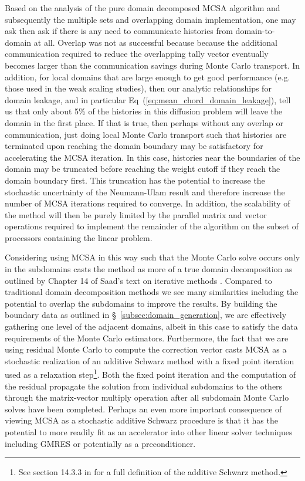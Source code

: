 Based on the analysis of the pure domain decomposed MCSA algorithm and
subsequently the multiple sets and overlapping domain implementation,
one may ask then ask if there is any need to communicate histories
from domain-to-domain at all. Overlap was not as successful because
because the additional communication required to reduce the
overlapping tally vector eventually becomes larger than the
communication savings during Monte Carlo transport. In addition, for
local domains that are large enough to get good performance
(e.g. those used in the weak scaling studies), then our analytic
relationships for domain leakage, and in particular
Eq~(\ref{eq:mean_chord_domain_leakage}), tell us that only about 5\%
of the histories in this diffusion problem will leave the domain in
the first place.  If that is true, then perhaps without any overlap or
communication, just doing local Monte Carlo transport such that
histories are terminated upon reaching the domain boundary may be
satisfactory for accelerating the MCSA iteration. In this case,
histories near the boundaries of the domain may be truncated before
reaching the weight cutoff if they reach the domain boundary
first. This truncation has the potential to increase the stochastic
uncertainty of the Neumann-Ulam result and therefore increase the
number of MCSA iterations required to converge. In addition, the
scalability of the method will then be purely limited by the parallel
matrix and vector operations required to implement the remainder of
the algorithm on the subset of processors containing the linear
problem.

Considering using MCSA in this way such that the Monte Carlo solve
occurs only in the subdomains casts the method as more of a true
domain decomposition as outlined by Chapter 14 of Saad's text on
iterative methods \citep{saad_iterative_2003}. Compared to traditional
domain decomposition methods we see many similarities including the
potential to overlap the subdomains to improve the results. By
building the boundary data as outlined in
\S~\ref{subsec:domain_generation}, we are effectively gathering one
level of the adjacent domains, albeit in this case to satisfy the data
requirements of the Monte Carlo estimators. Furthermore, the fact that
we are using residual Monte Carlo to compute the correction vector
casts MCSA as a stochastic realization of an additive Schwarz method
with a fixed point iteration used as a relaxation step\footnote{See
  section 14.3.3 in \citep{saad_iterative_2003} for a full definition
  of the additive Schwarz method.}. Both the fixed point iteration and
the computation of the residual propagate the solution from individual
subdomains to the others through the matrix-vector multiply operation
after all subdomain Monte Carlo solves have been completed. Perhaps an
even more important consequence of viewing MCSA as a stochastic
additive Schwarz procedure is that it has the potential to more
readily fit as an accelerator into other linear solver techniques
including GMRES or potentially as a preconditioner.

